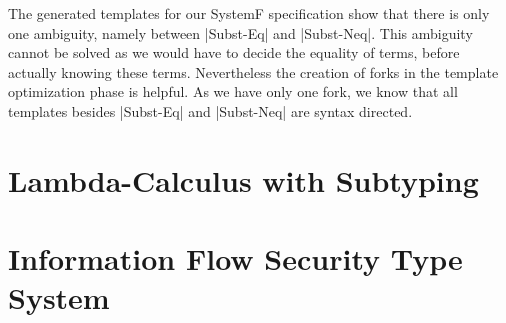 The generated templates for our SystemF specification show that there
is only one ambiguity, namely between \code|Subst-Eq| and
\code|Subst-Neq|. This ambiguity cannot be solved as we would have to
decide the equality of terms, before actually knowing these
terms. Nevertheless the creation of forks in the template optimization
phase is helpful. As we have only one fork, we know that all templates
besides \code|Subst-Eq| and \code|Subst-Neq| are syntax directed.
\section{Lambda-Calculus with Subtyping}
\label{sec:lambda-calculus-with}
\section{Information Flow Security Type System}
\label{sec:inform-flow-secur-1}

